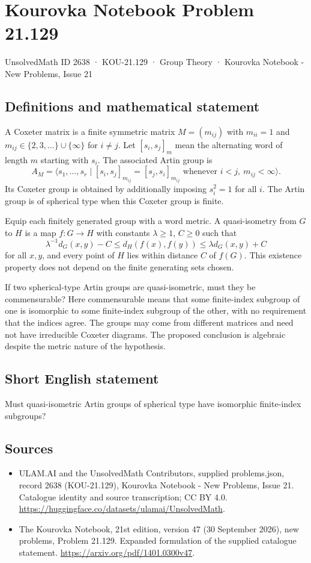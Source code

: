 \documentclass[11pt,a4paper]{article}
\begin{document}
\section*{Kourovka Notebook Problem 21.129}\label{2638}
{\small UnsolvedMath ID 2638 · KOU-21.129 · Group Theory · Kourovka Notebook - New Problems, Issue 21}
\subsection{Definitions and mathematical statement}
A Coxeter matrix is a finite symmetric matrix $M=(m_{ij})$ with $m_{ii}=1$ and $m_{ij}\in\{2,3,\ldots\}\cup\{\infty\}$ for $i\ne j$. Let $[s_i,s_j]_m$ mean the alternating word of length $m$ starting with $s_i$. The associated Artin group is
\[
 A_M=\langle s_1,\ldots,s_r\mid
 [s_i,s_j]_{m_{ij}}=[s_j,s_i]_{m_{ij}}
 \text{ whenever }i<j,\ m_{ij}<\infty\rangle.
\]
Its Coxeter group is obtained by additionally imposing $s_i^2=1$ for all $i$. The Artin group is of spherical type when this Coxeter group is finite.

Equip each finitely generated group with a word metric. A quasi-isometry from $G$ to $H$ is a map $f:G\to H$ with constants $\lambda\ge1$, $C\ge0$ such that
\[
 \lambda^{-1}d_G(x,y)-C\le d_H(f(x),f(y))
 \le\lambda d_G(x,y)+C
\]
for all $x,y$, and every point of $H$ lies within distance $C$ of $f(G)$. This existence property does not depend on the finite generating sets chosen.

If two spherical-type Artin groups are quasi-isometric, must they be commensurable? Here commensurable means that some finite-index subgroup of one is isomorphic to some finite-index subgroup of the other, with no requirement that the indices agree. The groups may come from different matrices and need not have irreducible Coxeter diagrams. The proposed conclusion is algebraic despite the metric nature of the hypothesis.
\subsection{Short English statement}
Must quasi-isometric Artin groups of spherical type have isomorphic finite-index subgroups?
\subsection{Sources}
\begin{itemize}
\item[S1] ULAM.AI and the UnsolvedMath Contributors, supplied problems.json, record 2638 (KOU-21.129), Kourovka Notebook - New Problems, Issue 21. Catalogue identity and source transcription; CC BY 4.0.
\url{https://huggingface.co/datasets/ulamai/UnsolvedMath}.
\item[S2] The Kourovka Notebook, 21st edition, version 47 (30 September 2026), new problems, Problem 21.129. Expanded formulation of the supplied catalogue statement.
\url{https://arxiv.org/pdf/1401.0300v47}.
\end{itemize}
\end{document}
